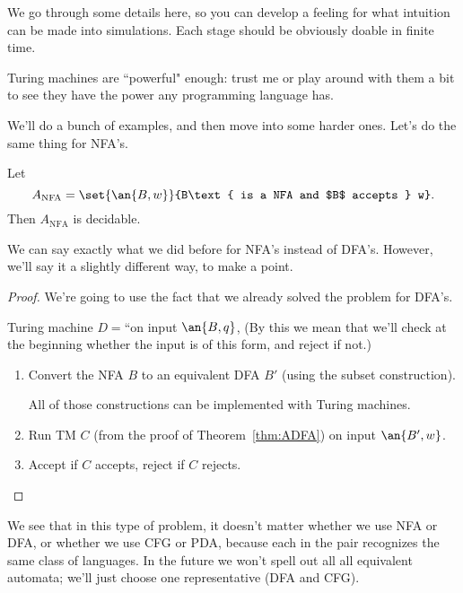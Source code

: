 We go through some details here, so you can develop a feeling for what intuition can be made into simulations.
Each stage should be obviously doable in finite time. 

Turing machines are ``powerful" enough: trust me or play around with them a bit to see they have the power any programming language has.


We'll do a bunch of examples, and then move into some harder ones.  Let's do the same thing for NFA's.
\begin{thm}
Let 
\[
A_{\text{NFA}}=\set{\an{B,w}}{B\text{ is a NFA and $B$ accepts } w}.
\]
Then $A_{\text{NFA}}$ is decidable. 
\end{thm}
We can say exactly what we did before for NFA's instead of DFA's. However, we'll say it a slightly different way, to make a point.
\begin{proof}
We're going to use the fact that we already solved the problem for DFA's.

Turing machine $D=$``on input $\an{B,q}$, 
(By this we mean that we'll check at the beginning whether the input is of this form, and reject if not.)
\begin{enumerate}
\item
Convert the NFA $B$ to an equivalent DFA $B'$ (using the subset construction).

All of those constructions can be implemented with Turing machines. 
\item Run TM $C$ (from the proof of Theorem~\ref{thm:ADFA}) on input $\an{B',w}$. 
\item Accept if $C$ accepts, reject if $C$ rejects. 
\end{enumerate}
\end{proof}
We see that in this type of problem, it doesn't matter whether we use NFA or DFA, or whether we use CFG or PDA, because each in the pair recognizes the same class of languages. In the future we won't spell out all all equivalent automata; we'll just choose one representative (DFA and CFG).

